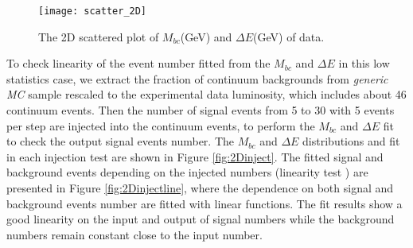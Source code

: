  \begin{figure}[htpb]
 \centering
 \texttt{[image: scatter\_2D]}
 \caption{The 2D scattered plot of $M_{bc}$(GeV) and $\Delta E$(GeV) of data.}
 \label{fig:2Dscatter}
 \end{figure}
To check linearity of the event number fitted from the $M_{bc}$ and $\Delta E$ in this low statistics case, we extract the fraction of continuum backgrounds from \textit{generic MC} sample rescaled to the experimental data luminosity, which includes about 46 continuum events. Then the number of signal events from 5 to 30 with 5 events per step are injected into the continuum events, to perform the $M_{bc}$ and $\Delta E$ fit to check the output signal events number. The $M_{bc}$ and $\Delta E$ distributions and fit in each injection test are shown in Figure \ref{fig:2Dinject}. The fitted signal and background events depending on the injected numbers (linearity test ) are presented in Figure \ref{fig:2Dinjectline}, where the dependence on both signal and background events number are fitted with linear functions. The fit results show a good linearity on the input and output of signal numbers while the background numbers remain constant close to the input number.
